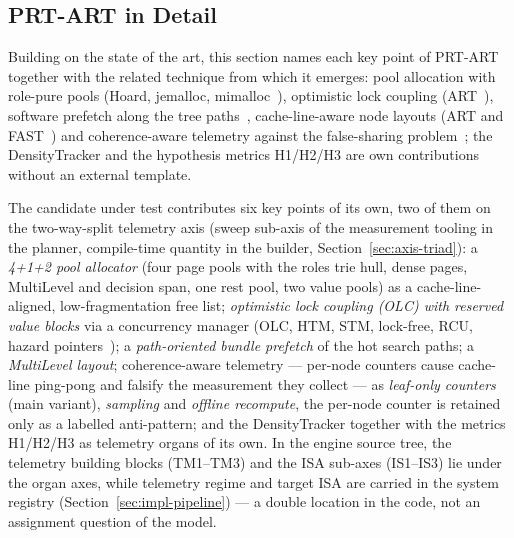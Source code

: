 \begin{nurkurz}
\section{PRT-ART in Detail}\label{sec:prtart-impl}
Building on the state of the art, this section names each key point of PRT-ART together with the
related technique from which it emerges: pool allocation with role-pure pools (Hoard, jemalloc,
mimalloc~\cite{berger2000hoard,evans2006jemalloc,leijen2019mimalloc}), optimistic lock coupling
(ART~\cite{leis2016olc}), software prefetch along the tree
paths~\cite{chen2001prefetch,zhang2025hierarchical}, cache-line-aware node layouts (ART and
FAST~\cite{leis2013art,kim2010fast}) and coherence-aware telemetry against the false-sharing
problem~\cite{torrellas1994falsesharing,kuehn2023bplustree}; the DensityTracker and the hypothesis
metrics H1/H2/H3 are own contributions without an external template.

The candidate under test contributes six key points of its own, two of them on the two-way-split
telemetry axis (sweep sub-axis of the measurement tooling in the planner, compile-time quantity in the
builder, Section~\ref{sec:axis-triad}): a \emph{4+1+2 pool allocator} (four page pools with the roles
trie hull, dense pages, MultiLevel and decision span, one rest pool, two value pools) as a
cache-line-aligned, low-fragmentation free list; \emph{optimistic lock coupling (OLC) with reserved
value blocks} via a concurrency manager (OLC, HTM, STM, lock-free, RCU, hazard
pointers~\cite{michael2004hazard}); a \emph{path-oriented bundle prefetch} of the hot search paths; a
\emph{MultiLevel layout}; coherence-aware telemetry --- per-node counters cause cache-line ping-pong
and falsify the measurement they collect --- as \emph{leaf-only counters} (main variant),
\emph{sampling} and \emph{offline recompute}, the per-node counter is retained only as a labelled
anti-pattern; and the DensityTracker together with the metrics H1/H2/H3 as telemetry organs of its own.
In the engine source tree, the telemetry building blocks (TM1--TM3) and the ISA sub-axes (IS1--IS3)
lie under the organ axes, while telemetry regime and target ISA are carried in the system registry
(Section~\ref{sec:impl-pipeline}) --- a double location in the code, not an assignment question of the
model.


\end{nurkurz}
